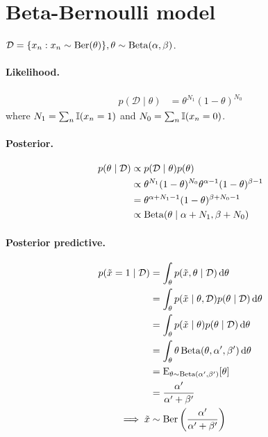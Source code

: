 \section{Beta-Bernoulli model}
$\mathcal D = \{x_n : x_n \sim \operatorname{Ber}(\theta)\}, \theta \sim \operatorname{Beta}(\alpha, \beta)$.

\paragraph{Likelihood.}
\begin{align*}
    p(\mathcal D \mid \theta)   &= \theta^{N_1} (1 - \theta)^{N_0}
\end{align*}
where $N_1 = \sum_n \operatorname{\mathbb I}(x_n = 1)$ and $N_0 = \sum_n \operatorname{\mathbb I}(x_n = 0)$.

\paragraph{Posterior.}
\begin{align*}
    p(\theta \mid \mathcal D)   &\propto p(\mathcal D \mid \theta) p(\theta) \\
                                &\propto \theta^{N_1} (1 - \theta)^{N_0} \theta^{\alpha - 1} (1 - \theta)^{\beta - 1} \\
                                &= \theta^{\alpha + N_1 - 1} (1 - \theta)^{\beta + N_0 - 1} \\
                                &\propto \operatorname{Beta}(\theta \mid \alpha + N_1, \beta + N_0)
\end{align*}

\paragraph{Posterior predictive.}
\begin{align*}
    p(\tilde x = 1 \mid \mathcal D) &= \int_{\theta} p(\tilde x, \theta \mid \mathcal D) \,\mathrm d\theta \\
                                    &= \int_{\theta} p(\tilde x \mid \theta, \mathcal D) p(\theta \mid \mathcal D) \,\mathrm d\theta \\
                                    &= \int_{\theta} p(\tilde x \mid \theta) p(\theta \mid \mathcal D) \,\mathrm d\theta \\
                                    &= \int_{\theta} \theta \operatorname{Beta}(\theta, \alpha', \beta') \,\mathrm d \theta \\
                                    &= \operatorname{\mathrm{E}}_{\theta \sim \operatorname{Beta}(\alpha', \beta')}[\theta] \\
                                    &= \frac{\alpha'}{\alpha' + \beta'} \\
    \implies \tilde x               &\sim \operatorname{Ber}\left(\frac{\alpha'}{\alpha' + \beta'}\right)
\end{align*}